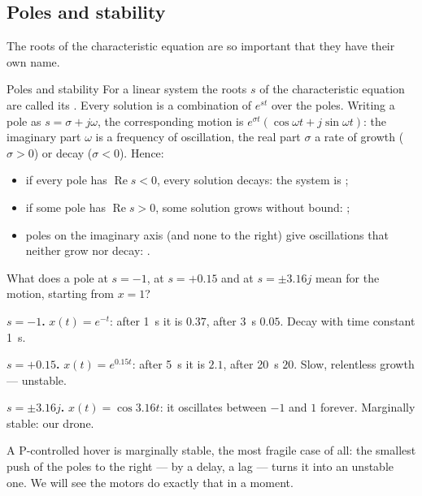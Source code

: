 \subsection{Poles and stability}
The roots of the characteristic equation are so important that they have their own name.

\begin{definition}{Poles and stability}
For a linear system the roots $s$ of the characteristic equation are called its . Every solution is a combination of $e^{st}$ over the poles. Writing a pole as $s = \sigma + j\omega$, the corresponding motion is $e^{\sigma t}(\cos\omega t + j\sin\omega t)$: the imaginary part $\omega$ is a frequency of oscillation, the real part $\sigma$ a rate of growth ($\sigma > 0$) or decay ($\sigma < 0$). Hence:
\begin{itemize}
  \item if every pole has $\operatorname{Re}s < 0$, every solution decays: the system is ;
  \item if some pole has $\operatorname{Re}s > 0$, some solution grows without bound: ;
  \item poles on the imaginary axis (and none to the right) give oscillations that neither grow nor decay: .
\end{itemize}
\end{definition}

\begin{example}
What does a pole at $s = -1$, at $s = +0.15$ and at $s = \pm 3.16j$ mean for the motion, starting from $x = 1$?

\textbf{$s = -1$.} $x(t) = e^{-t}$: after \SI{1}{s} it is $0.37$, after \SI{3}{s} $0.05$. Decay with time constant \SI{1}{s}.

\textbf{$s = +0.15$.} $x(t) = e^{0.15t}$: after \SI{5}{s} it is $2.1$, after \SI{20}{s} $20$. Slow, relentless growth — unstable.

\textbf{$s = \pm3.16j$.} $x(t) = \cos 3.16t$: it oscillates between $-1$ and $1$ forever. Marginally stable: our drone.
\end{example}

A P-controlled hover is marginally stable, the most fragile case of all: the smallest push of the poles to the right — by a delay, a lag — turns it into an unstable one. We will see the motors do exactly that in a moment.

